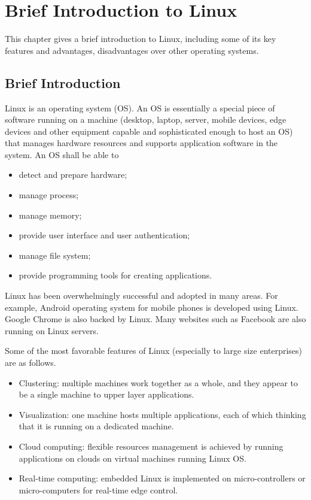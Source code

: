 \chapter{Brief Introduction to Linux}

This chapter gives a brief introduction to Linux, including some of its key features and advantages, disadvantages over other operating systems.

\section{Brief Introduction}

Linux is an operating system (OS). An OS is essentially a special piece of software running on a machine (desktop, laptop, server, mobile devices, edge devices and other equipment capable and sophisticated enough to host an OS) that manages hardware resources and supports application software in the system. An OS shall be able to
\begin{itemize}
  \item detect and prepare hardware;
  \item manage process;
  \item manage memory;
  \item provide user interface and user authentication;
  \item manage file system;
  \item provide programming tools for creating applications.
\end{itemize}

Linux has been overwhelmingly successful and adopted in many areas. For example, Android operating system for mobile phones is developed using Linux. Google Chrome is also backed by Linux. Many websites such as Facebook are also running on Linux servers.

Some of the most favorable features of Linux (especially to large size enterprises) are as follows.
\begin{itemize}
  \item Clustering: multiple machines work together as a whole, and they appear to be a single machine to upper layer applications.
  \item Visualization: one machine hosts multiple applications, each of which thinking that it is running on a dedicated machine.
  \item Cloud computing: flexible resources management is achieved by running applications on clouds on virtual machines running Linux OS.
  \item Real-time computing: embedded Linux is implemented on micro-controllers or micro-computers for real-time edge control.
\end{itemize}

